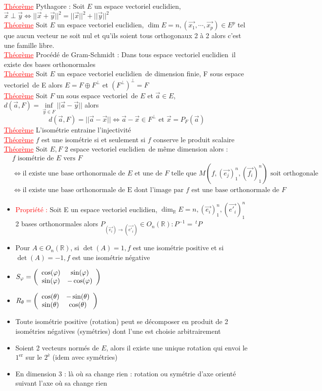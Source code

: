 \documentclass[a4paper, 11pt, french]{article}
\newcommand{\R}{\mathbb{R}}
\newcommand{\ev}{espace vectoriel}
\newcommand{\eve}{espace vectoriel euclidien}
\newcommand{\te}{\theta}
\newcommand{\ph}{\varphi}
\newcommand{\thm}{\textcolor{red}{\underline{Théorème} }}
\newcommand{\ppt}{\textcolor{red}{Propriété : }}
\begin{document}
	 \thm Pythagore : Soit $E$ un \eve, $\vec{x} \perp \vec{y} \iff {||\vec{x}+\vec{y}||^2=||\vec{x}||^2+||\vec{y}||^2}$ \\
	 \thm Soit $E$  un \eve, $\dim E=n, (\vec{x_1},\cdots,\vec{x_p}) \in E^p$ tel que aucun vecteur ne soit nul et qu'ils soient tous orthogonaux 2 à 2 alors c'est une famille libre. \\
	 \thm Procédé de Gram-Schmidt : Dans tous  \eve \, il existe des bases orthonormales \\
	 \thm Soit $E$ un \eve \, de dimension finie, F sous \ev\, de E alors $E=F\oplus F^{\perp}$ et $(F^{\perp})^{\perp}=F$ \\
	 \thm Soit $F$ un sous \ev \, de $E$ et $\vec{a} \in E$, $d(\vec{a},F)=\underset{\vec{y} \in F}\inf ||\vec{a}-\vec{y}||$ alors $$d(\vec{a},F)=||\vec{a}-\vec{x}|| \iff \vec{a}-\vec{x} \in F^{\perp} \text{ et }\vec{x}=P_F(\vec{a})$$
	 \thm L'isométrie entraine l'injectivité \\
	 \thm $f$ est une isométrie si et seulement si $f$ conserve le produit scalaire \\
	 \thm Soit $E,F$ 2 \eve \, de même dimension alors :
			\begin{align*}
				&f \text{ isométrie de $E$ vers $F$} \\
				&\iff \text{il existe une base orthonormale de $E$ et une de $F$ telle que $M(f,(\vec{e_j})_1^n,(\vec{f_i})_1^n)$ soit orthogonale} \\
				&\iff \text{il existe une base orthonormale de E$$ dont l'image par $f$ est une base orthonormale de $F$}
			\end{align*}
	\begin{itemize}
 		\item \ppt Soit E un \eve, $\dim_{\R}E=n, (\vec{e_i})_1^n,(\vec{e'_i})_1^n$ 2 bases orthonormales alors $P_{(\vec{e_i}) \rightarrow (\vec{e'_i})} \in O_n(\R) : P^{-1}=\,^tP$
 		\item Pour $A \in O_n(\R)$, si $\det(A)=1, f$ est une isométrie positive et si $\det(A)=-1,f$ est une isométrie négative
 		\item $S_\ph=\left( \begin{array}{c c} \cos(\ph) & \sin(\ph) \\ \sin(\ph) & -\cos(\ph) \end{array} \right)$
 		\item $R_\te=\left( \begin{array}{c c} \cos(\te) & -\sin(\te) \\ \sin(\te) & \cos(\te) \end{array} \right)$
 		\item Toute isométrie positive (rotation) peut se décomposer en produit de 2 isométries négatives (symétries) dont l'une est choisie arbitrairement
		\item Soient 2 vecteurs normés de $E$, alors il existe une unique rotation qui envoi le $1^{\text{er}}$ sur le $2^{\text{è}}$ (idem avec symétries)
		\item En dimension 3 : là où sa change rien : rotation ou symétrie d'axe orienté suivant l'axe où sa change rien
	\end{itemize}
\end{document}
